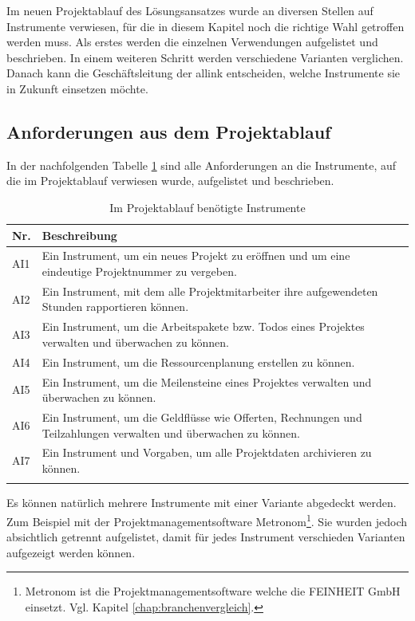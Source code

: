Im neuen Projektablauf des Lösungsansatzes wurde an diversen Stellen auf Instrumente
verwiesen, für die in diesem Kapitel noch die richtige Wahl getroffen werden
muss. Als erstes werden die einzelnen Verwendungen aufgelistet und beschrieben.
In einem weiteren Schritt werden verschiedene Varianten verglichen. Danach
kann die Geschäftsleitung der allink entscheiden, welche Instrumente sie
in Zukunft einsetzen möchte.

\subsection{Anforderungen aus dem Projektablauf}
In der nachfolgenden Tabelle \ref{tab:projektablauf_instrumente} sind alle
Anforderungen an die Instrumente, auf die im Projektablauf verwiesen wurde, aufgelistet 
und beschrieben.

\begin{longtable}{lp{14cm}}
    \toprule \textbf{Nr.} & \textbf{Beschreibung} \\
    \midrule AI1 & Ein Instrument, um ein neues Projekt zu eröffnen und um eine 
        eindeutige Projektnummer zu vergeben. \\
    \midrule AI2 & Ein Instrument, mit dem alle Projektmitarbeiter ihre 
        aufgewendeten Stunden rapportieren können. \\
    \midrule AI3 & Ein Instrument, um die Arbeitspakete bzw. Todos eines Projektes
        verwalten und überwachen zu können. \\
    \midrule AI4 & Ein Instrument, um die Ressourcenplanung erstellen zu können. \\
    \midrule AI5 & Ein Instrument, um die Meilensteine eines Projektes verwalten 
        und überwachen zu können.\\
    \midrule AI6 & Ein Instrument, um die Geldflüsse wie Offerten, Rechnungen 
        und Teilzahlungen verwalten und überwachen zu können. \\
    \midrule AI7 & Ein Instrument und Vorgaben, um alle Projektdaten archivieren 
        zu können. \\
    \bottomrule
    \caption[Im Projektablauf benötigte Instrumente]{Im Projektablauf benötigte 
        Instrumente\footnotemark}
    \label{tab:projektablauf_instrumente}
\end{longtable}

Es können natürlich mehrere Instrumente mit einer Variante abgedeckt werden.
Zum Beispiel mit der Projektmanagementsoftware Metronom\footnote{Metronom ist die 
Projektmanagementsoftware welche die FEINHEIT GmbH einsetzt.
Vgl. Kapitel \ref{chap:branchenvergleich}.}. Sie wurden jedoch absichtlich getrennt 
aufgelistet, damit für jedes Instrument verschieden Varianten aufgezeigt werden können.

